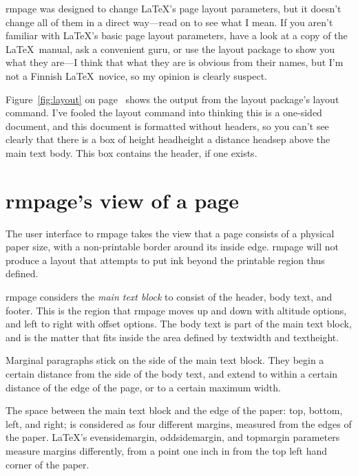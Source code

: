 \documentclass[11pt,loose,twoside,touchwider,longish,
                      noheaders,a4paper,notstdmargins]{report}
\newcommand*{\packname}[1]{{\sffamily #1}}
\DeclareRobustCommand*{\comname}[1]{{\ttfamily\makeatletter\bs #1\makeatother}}
\newcommand*{\classname}[1]{{\ttfamily #1}}
\newcommand*{\optname}[1]{{\ttfamily #1}}
\newcommand*{\rmpage}{\classname{rmpage}\xspace}
\begin{document}
\rmpage was designed to change \LaTeX's page layout parameters, but it
doesn't change all of them in a direct way---read on to see what I
mean.  If you aren't familiar with \LaTeX's basic page layout
parameters, have a look at a copy of the \LaTeX\ manual, ask a
convenient guru, or use the \packname{layout} package to show you what
they are---I think that what they are is obvious from their names, but
I'm not a Finnish \LaTeX\ novice, so my opinion is clearly suspect.

Figure~\ref{fig:layout} on page~\pageref{fig:layout} shows the output
from the \packname{layout} package's \comname{layout} command.  I've
fooled the \comname{layout} command into thinking this is a one-sided
document, and this document is formatted without headers, so you can't
see clearly that there is a box of height \comname{headheight} a
distance \comname{headsep} above the main text body.  This box
contains the header, if one exists.

\section{\rmpage's view of a page}

The user interface to \rmpage takes the view that a page consists of
a physical paper size, with a non-printable border around its inside
edge.  \rmpage will not produce a layout that attempts to put ink
beyond the printable region thus defined.

\rmpage considers the \emph{main text block} to consist of the header,
body text, and footer.  This is the region that \rmpage moves up and
down with \optname{altitude} options, and left to right with
\optname{offset} options.  The body text is part of the main text
block, and is the matter that fits inside the area defined by
\comname{textwidth} and \comname{textheight}.

Marginal paragraphs stick on the side of the main text block.  They
begin a certain distance from the side of the body text, and extend to
within a certain distance of the edge of the page, or to a certain
maximum width.

The space between the main text block and the edge of the paper: top,
bottom, left, and right; is considered as four different margins,
measured from the edges of the paper.  \LaTeX's
\comname{evensidemargin}, \comname{oddsidemargin}, and
\comname{topmargin} parameters measure margins differently, from a
point one inch in from the top left hand corner of the paper.
\end{document}
